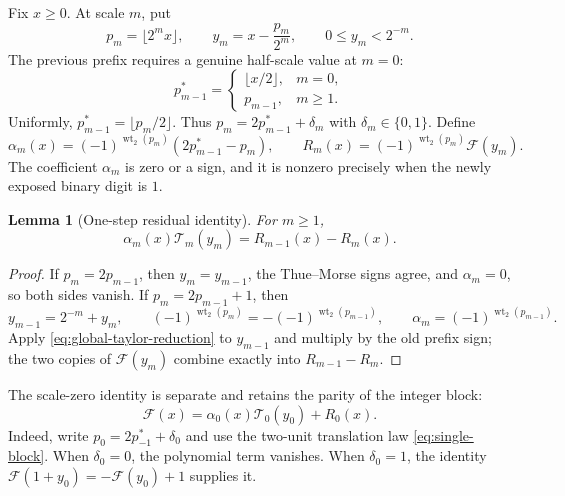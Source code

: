 \documentclass[11pt,oneside]{article}
\newtheorem{lemma}[theorem]{Lemma}
\theoremstyle{definition}
\theoremstyle{remark}
\newcommand{\wt}{\operatorname{wt}_2}
\begin{document}
Fix $x\ge0$.  At scale $m$, put
\begin{equation}
 p_m=\lfloor2^mx\rfloor,\qquad
 y_m=x-\frac{p_m}{2^m},\qquad 0\le y_m<2^{-m}.            \label{eq:global-prefix-tail}
\end{equation}
The previous prefix requires a genuine half-scale value at $m=0$:
\begin{equation}
 p^*_{m-1}=\begin{cases}
  \lfloor x/2\rfloor,&m=0,\\
  p_{m-1},&m\ge1.
 \end{cases}                                             \label{eq:global-previous-prefix}
\end{equation}
Uniformly, $p^*_{m-1}=\lfloor p_m/2\rfloor$.  Thus
$p_m=2p^*_{m-1}+\delta_m$ with $\delta_m\in\{0,1\}$.  Define
\begin{equation}
 \alpha_m(x)=(-1)^{\wt(p_m)}(2p^*_{m-1}-p_m),\qquad
 R_m(x)=(-1)^{\wt(p_m)}\mathcal F(y_m).                  \label{eq:global-reduction-coefficient}
\end{equation}
The coefficient $\alpha_m$ is zero or a sign, and it is nonzero precisely when the newly
exposed binary digit is $1$.

\begin{lemma}[One-step residual identity]
For $m\ge1$,
\begin{equation}
 \alpha_m(x)\mathcal T_m(y_m)=R_{m-1}(x)-R_m(x).          \label{eq:global-one-step-residual}
\end{equation}
\end{lemma}

\begin{proof}
If $p_m=2p_{m-1}$, then $y_m=y_{m-1}$, the Thue--Morse signs agree, and
$\alpha_m=0$, so both sides vanish.  If $p_m=2p_{m-1}+1$, then
\begin{equation*}
 y_{m-1}=2^{-m}+y_m,\qquad
 (-1)^{\wt(p_m)}=-(-1)^{\wt(p_{m-1})},\qquad
 \alpha_m=(-1)^{\wt(p_{m-1})}.
\end{equation*}
Apply \eqref{eq:global-taylor-reduction} to $y_{m-1}$ and multiply by the old prefix sign;
the two copies of $\mathcal F(y_m)$ combine exactly into $R_{m-1}-R_m$.
\end{proof}

The scale-zero identity is separate and retains the parity of the integer block:
\begin{equation}
 \mathcal F(x)=\alpha_0(x)\mathcal T_0(y_0)+R_0(x).       \label{eq:global-scale-zero-step}
\end{equation}
Indeed, write $p_0=2p^*_{-1}+\delta_0$ and use the two-unit translation law
\eqref{eq:single-block}.  When $\delta_0=0$, the polynomial term vanishes.  When
$\delta_0=1$, the identity $\mathcal F(1+y_0)=-\mathcal F(y_0)+1$ supplies it.
\end{document}
